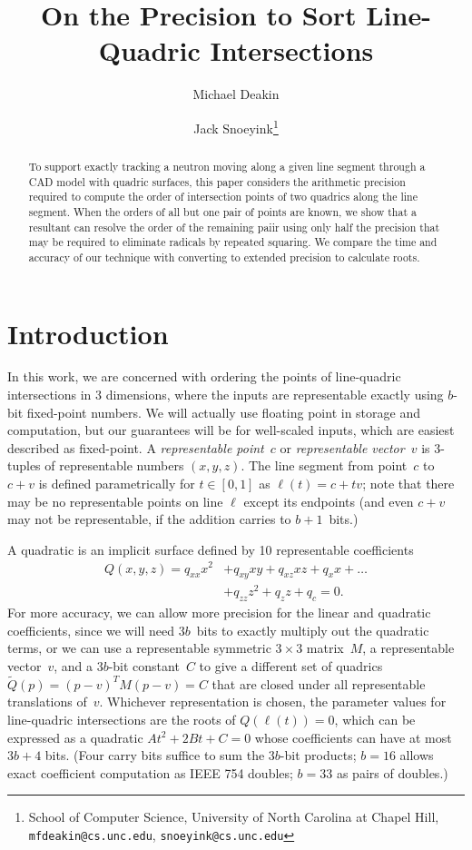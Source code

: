 \documentclass{cccg16}
\title{On the Precision to Sort Line-Quadric Intersections}
\author{Michael Deakin \and Jack Snoeyink\thanks{School of Computer
    Science, University of North Carolina at Chapel Hill, {\tt
      mfdeakin@cs.unc.edu}, {\tt snoeyink@cs.unc.edu}}}
\begin{document}
\thispagestyle{empty}
\maketitle

\begin{abstract}
  To support exactly tracking a neutron
  moving along a given line segment through a CAD model with quadric
  surfaces,  this paper considers the arithmetic precision required
  to compute the order of intersection points of two quadrics along the line segment. When the orders of all but one pair of points are known, we show that a resultant can
  resolve the order of the remaining paiir using only half the precision that may be
  required to eliminate radicals by repeated squaring. We compare
  the time and accuracy of our technique with converting to extended
  precision to calculate roots.
\end{abstract}


\section{Introduction}
In this work, we are concerned with ordering the points of line-quadric
intersections in 3 dimensions, where the inputs are representable exactly using $b$-bit fixed-point numbers.
We will actually use floating point in storage and computation, but our guarantees will be for well-scaled inputs, which are easiest described as fixed-point. 
A {\it representable point}~$c$ or {\it representable vector}~$v$ is $3$-tuples of representable numbers $(x, y, z)$. The line segment from point~$c$ to~$c+v$ is defined parametrically for $t\in [0,1]$ as $\ell(t)=c+tv$; note that there may be no representable points on line $\ell$ except its endpoints (and even $c+v$ may not be representable, if the addition carries to $b+1$~bits.)

A quadratic is an implicit surface defined by 10 representable coefficients
\begin{align*}Q(x, y, z)=q_{xx} x^2 &+ q_{xy} xy + q_{xz} xz + q_x x + \dots \\
&+ q_{zz} z^2 + q_{z} z + q_c = 0.
\end{align*}
For more accuracy, we can allow more precision for the linear and quadratic coefficients, since we will need $3b$~bits to exactly multiply out the quadratic terms, or we can use a representable symmetric $3\times 3$ matrix~$M$, a representable vector~$v$, and a $3b$-bit constant~$C$ to give a different set of quadrics $\tilde Q(p) = (p-v)^TM(p-v) = C$ that are closed under all representable translations of~$v$. Whichever representation is chosen, the parameter values for line-quadric intersections are the roots of $Q(\ell(t))=0$, which can be expressed as a quadratic $At^2+2Bt+C=0$ whose coefficients can have at most $3b+4$ bits.  (Four carry bits suffice to sum the $3b$-bit products; $b=16$ allows exact coefficient computation as IEEE 754 doubles; $b=33$ as pairs of doubles.)   
\end{document}
